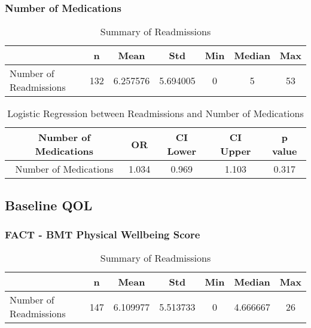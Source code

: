 \documentclass[12pt,]{article}
\begin{document}
\pagebreak

\subsubsection{Number of Medications}\label{number-of-medications}

\begin{table}[!h]

\caption{\label{tab:unnamed-chunk-30}Summary of Readmissions}
\centering
\begin{tabular}{>{\raggedright\arraybackslash}p{5cm}cccccc}
\toprule
  & n & Mean & Std & Min & Median & Max\\
\midrule
\rowcolor{white}  Number of Readmissions & 132 & 6.257576 & 5.694005 & 0 & 5 & 53\\
\bottomrule
\end{tabular}
\end{table}

\begin{table}[!h]

\caption{\label{tab:unnamed-chunk-30}Logistic Regression between Readmissions and Number of Medications}
\centering
\begin{tabular}{ccccc}
\toprule
Number of Medications & OR & CI Lower & CI Upper & p value\\
\midrule
\rowcolor{white}  Number of Medications & 1.034 & 0.969 & 1.103 & 0.317\\
\bottomrule
\end{tabular}
\end{table}

\pagebreak

\subsection{Baseline QOL}\label{baseline-qol}

\subsubsection{FACT - BMT Physical Wellbeing
Score}\label{fact---bmt-physical-wellbeing-score}

\begin{table}[!h]

\caption{\label{tab:unnamed-chunk-31}Summary of Readmissions}
\centering
\begin{tabular}{>{\raggedright\arraybackslash}p{5cm}cccccc}
\toprule
  & n & Mean & Std & Min & Median & Max\\
\midrule
\rowcolor{white}  Number of Readmissions & 147 & 6.109977 & 5.513733 & 0 & 4.666667 & 26\\
\bottomrule
\end{tabular}
\end{table}
\end{document}
